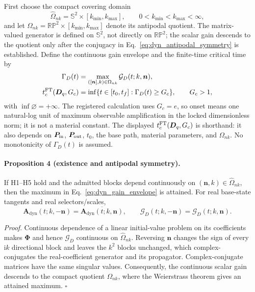 First choose the compact covering domain
\begin{equation}
 \widehat\Omega_{nk}=\mathbb S^2\times[k_{\min},k_{\max}],
 \qquad 0<k_{\min}<k_{\max}<\infty,
 \label{eq:dyn_covering_search_domain}
\end{equation}
and let
$\Omega_{nk}=\mathbb{RP}^2\times[k_{\min},k_{\max}]$ denote its antipodal
quotient.  The matrix-valued generator is defined on $\mathbb S^2$, not
directly on $\mathbb{RP}^2$; the scalar gain descends to the quotient only after
the conjugacy in Eq.~\eqref{eq:dyn_antipodal_symmetry} is established.  Define
the continuous gain envelope and the finite-time critical time by
\begin{align}
 \Gamma_D(t)
 &=\max_{([\boldsymbol n],k)\in\Omega_{nk}}
   \mathcal G_D(t;k,\boldsymbol n),
 \label{eq:dyn_gain_envelope}\\
 t_c^{\rm FT}(\boldsymbol D_q,G_c)
 &=\inf\{t\in[t_0,t_f]:\Gamma_D(t)\ge G_c\},
 \qquad G_c>1,
 \label{eq:dyn_finite_critical_time}
\end{align}
with $\inf\varnothing=+\infty$.  The registered calculation uses $G_c=e$, so
onset means one natural-log unit of maximum observable amplification in the
locked dimensionless norm; it is not a material constant.
The displayed $t_c^{\rm FT}(\boldsymbol D_q,G_c)$ is shorthand: it also depends
on $\boldsymbol P_{\rm in}$, $\boldsymbol P_{\rm out}$, $t_0$, the base path,
material parameters, and $\Omega_{nk}$.  No monotonicity of $\Gamma_D(t)$ is
assumed.

\paragraph{Proposition 4 (existence and antipodal symmetry).}
If H1--H5 hold and the admitted blocks depend continuously on
$(\boldsymbol n,k)\in\widehat\Omega_{nk}$, then the maximum in
Eq.~\eqref{eq:dyn_gain_envelope} is attained.  For real base-state tangents and
real selectors/scales,
\begin{equation}
 \boldsymbol A_{\mathrm{dyn}}(t;k,-\boldsymbol n)
 =\overline{\boldsymbol A_{\mathrm{dyn}}(t;k,\boldsymbol n)},
 \qquad
 \mathcal G_D(t;k,-\boldsymbol n)
 =\mathcal G_D(t;k,\boldsymbol n).
 \label{eq:dyn_antipodal_symmetry}
\end{equation}

\emph{Proof.}
Continuous dependence of a linear initial-value problem on its coefficients
makes $\boldsymbol\Phi$ and hence $\mathcal G_D$ continuous on
$\widehat\Omega_{nk}$.  Reversing $\boldsymbol n$ changes the
sign of every $\mathrm{i}k$ directional block and leaves the $k^2$ blocks
unchanged, which complex-conjugates the real-coefficient generator and its
propagator.  Complex-conjugate matrices have the same singular values.
Consequently, the continuous scalar gain descends to the compact quotient
$\Omega_{nk}$, where the Weierstrass theorem gives an attained maximum.
\hfill$\square$

